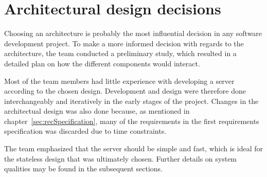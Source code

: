 \section{Architectural design decisions}
Choosing an architecture is probably the most influential decision in any software development project. To make a more informed decision with regards to the architecture, the team conducted a preliminary study, which resulted in a detailed plan on how the different components would interact. 

Most of the team members had little experience with developing a server according to the chosen design. Development and design were therefore done interchangeably and iteratively in the early stages of the project. Changes in the architectual design was also done because, as mentioned in chapter~\ref{sec:recSpecification}, many of the requirements in the first requirements specification was discarded due to time constraints.

The team emphasized that the server should be simple and fast, which is ideal for the stateless design that was ultimately chosen. Further details on system qualities may be found in the subsequent sections.